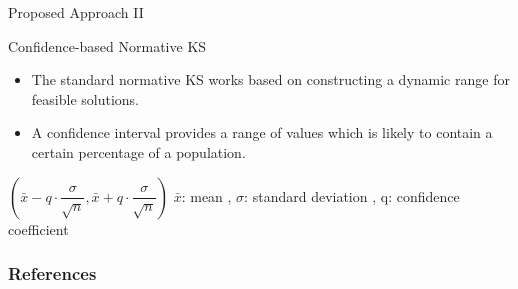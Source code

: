 \documentclass[table]{beamer}
\begin{document}

	\begin{frame}{Proposed Approach II}
		\begin{block}{Confidence-based Normative KS}
			\begin{itemize}
				\item The standard normative KS works based on constructing a dynamic range for feasible solutions.
				\newline \item A confidence interval provides a range of values which is likely to contain a certain percentage of a population.
			\end{itemize}
		\end{block}
		\begin{block}{}
			\centering
			$(\bar{x}-q\cdot\dfrac{\sigma}{\sqrt{n}} , \bar{x}+q\cdot\dfrac{\sigma}{\sqrt{n}})$\newline
			$\bar{x}$: mean , $\sigma$: standard deviation , q: confidence coefficient
		\end{block}
	\end{frame}



	\begin{frame}[allowframebreaks]
		\frametitle{References}
		\fontsize{6pt}{3pt}
		
		
	\end{frame}
\end{document}
